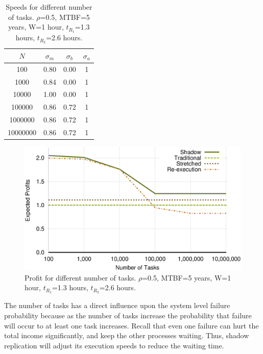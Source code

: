 \begin{table}[!h]\small
	\caption{Speeds for different number of tasks. $\rho$=0.5, MTBF=5 years, W=1 hour, $t_{R_1}$=1.3 hours, $t_{R_2}$=2.6 hours.}
	\centering
		\begin{tabular}{|c|c|c|c|}
		\hline
		$N$ & $\sigma_m$ & $\sigma_b$ & $\sigma_a$ \\
		\hline
		100			&	0.80	&	0.00	&	1 \\
		\hline
		1000		&	0.84	&	0.00	&	1 \\
		\hline
		10000		&	1.00	&	0.00	&	1 \\
		\hline
		100000		&	0.86	&	0.72	&	1 \\
		\hline
		1000000		&	0.86	&	0.72	&	1 \\
		\hline
		10000000	&	0.86	&	0.72	&   1 \\
		\hline
		\end{tabular}
	\label{tbl:n}
\end{table}

\begin{figure}[!h]	
	\begin{center}
			\includegraphics[width=\columnwidth]{diagrams/n_profit.eps}
	\end{center}
	\caption{Profit for different number of tasks. $\rho$=0.5, MTBF=5 years, W=1 hour, $t_{R_1}$=1.3 hours, $t_{R_2}$=2.6 hours.}
	\label{fig:n}
\end{figure}

The number of tasks has a direct influence upon the system level
failure probability because as the number of tasks increase the
probability that failure will occur to at least one task
increases. Recall that even one failure can hurt the total income
significantly, and keep the other processes waiting. Thus, shadow
replication will adjust its execution speeds to reduce the waiting
time.

